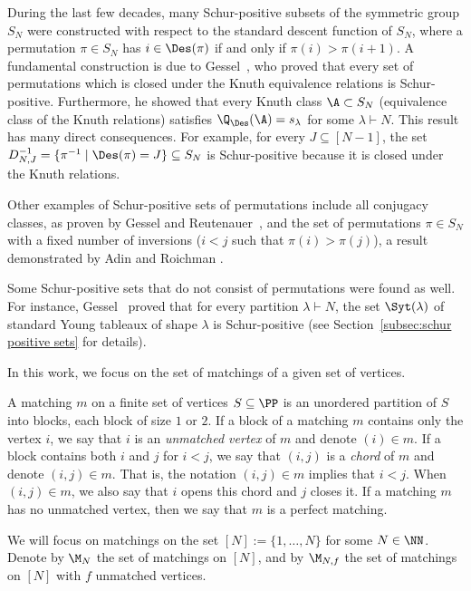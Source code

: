 During the last few decades, many Schur-positive subsets of the symmetric group $S_N$ were constructed with respect to the standard descent function of $S_N$, where a permutation $\pi \in S_N$ has $i \in \Des(\pi)$ if and only if $\pi(i) > \pi(i+1)$. A fundamental construction is due to Gessel~\cite{knuth_classes_schur_positive}, who proved that every set of permutations which is closed under the Knuth equivalence relations is Schur-positive. Furthermore, he showed that every Knuth class $\A \subset S_N$ (\ie equivalence class of the Knuth relations) satisfies $\Q_{\Des}(\A) = s_\lambda$ for some $\lambda \vdash N$. This result has many direct consequences. For example, for every $J \subseteq [N-1]$, the set $D_{N,J}^{-1} = \{ \pi^{-1} \mid \Des(\pi)=J\} \subseteq S_N$ is Schur-positive because it is closed under the Knuth relations.

Other examples of Schur-positive sets of permutations include all conjugacy classes, as proven by Gessel and Reutenauer~\cite{gessel1993counting}, and the set of permutations $\pi \in S_N$ with a fixed number of inversions (\ie $i<j$ such that $\pi(i) > \pi(j)$), a result demonstrated by Adin and Roichman \cite[Prop.\ 9.5]{adin_roichman_fine_set}.

Some Schur-positive sets that do not consist of permutations were found as well. For instance, Gessel~\cite{knuth_classes_schur_positive} proved that for every partition $\lambda \vdash N$, the set $\Syt(\lambda)$ of standard Young tableaux of shape $\lambda$ is Schur-positive (see Section~\ref{subsec:schur positive sets} for details).

In this work, we focus on the set of matchings of a given set of vertices.
\begin{definition}
\label{def:matching}
    A matching $m$ on a finite set of vertices $S \subseteq \PP$ is an unordered partition of $S$ into blocks, each block of size $1$ or $2$. If a block of a matching $m$ contains only the vertex $i$, we say that $i$ is an \emph{unmatched vertex} of $m$ and denote $(i) \in m$. If a block contains both $i$ and $j$ for $i<j$, we say that $(i,j)$ is a \emph{chord} of $m$ and denote $(i,j) \in m$. That is, the notation $(i,j)\in m$ implies that $i<j$. When $(i,j) \in m$, we also say that $i$ opens this chord and $j$ closes it. If a matching $m$ has no unmatched vertex, then we say that $m$ is a perfect matching.
\end{definition}

We will focus on matchings on the set $[N] := \{1,\dots, N\}$ for some $N \in \NN$. Denote by $\M_N$ the set of matchings on $[N]$, and by $\M_{N,f}$ the set of matchings on $[N]$ with $f$ unmatched vertices.

